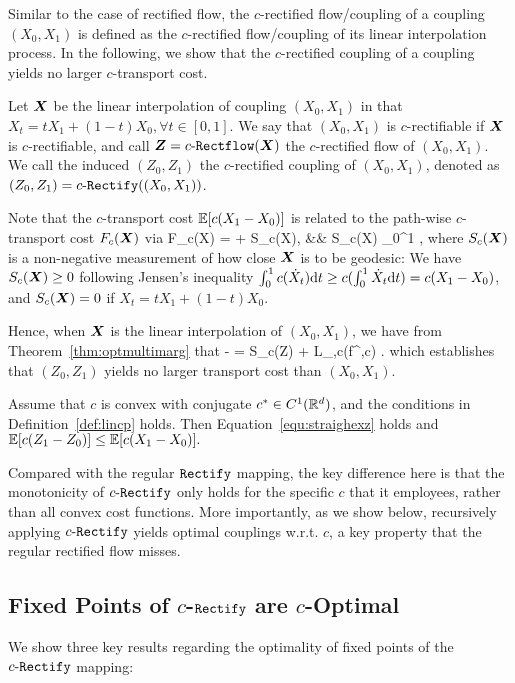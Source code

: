 Similar to the case of rectified flow, 
the $c$-rectified flow/coupling of a coupling $(X_0,X_1)$ 
is defined as the  $c$-rectified flow/coupling of its linear interpolation process.  
In the following, we show that the $c$-rectified coupling of a coupling %
yields no larger
{$c$-transport cost}. %

\begin{mydef}\label{def:lincp}
Let ${\boldsymbol{X}}$ be the linear interpolation of 
coupling $(X_0,X_1)$ in that $ X_t = t X_1 + (1-t) X_0,\forall t\in[0,1]$.  %
We say that $(X_0,X_1)$ is $c$-rectifiable if ${\boldsymbol{X}}$ is $c$-rectifiable, and call ${\boldsymbol{Z}} = c\text{-}\mathtt{Rectflow}({\boldsymbol{ X}})$ the $c$-rectified flow of $(X_0,X_1)$. 
We call the induced $(Z_0,Z_1)$ the $c$-rectified coupling of $(X_0,X_1)$, denoted as $(Z_0,Z_1) = c\text{-}\mathtt{Rectify}((X_0,X_1))$. 
\end{mydef}

Note that the 
$c$-transport cost $\mathbb{E}[c(X_1-X_0)]$ is related to 
{the path-wise $c$-transport cost $F_c({\boldsymbol{X}})$} via 
\bb 
F_{c}(\vv X) = \E[c(X_1-X_0)] + S_c(\vv X), 
&& S_c(\vv X)  \int_0^1 \E[c(\dot X_t) - c(X_1-X_0)] \dt, 
\ee 
where $S_c({\boldsymbol{X}})$ is a non-negative measurement of how close ${\boldsymbol{X}}$ is to be {geodesic}: 
We have $S_c({\boldsymbol{X}}) \geq 0$
 following Jensen's inequality $\int_0^1 c(\dot X_t)\mathrm{d}t  \geq c(\int_0^1 \dot X_t\mathrm{d}t ) = c(X_1-X_0)$, and $S_c({\boldsymbol{X}}) = 0$ if $X_t = t X_1 + (1-t) X_0$. 
 
Hence, when ${\boldsymbol{X}}$ is the linear interpolation of $(X_0,X_1)$, we have from Theorem~\ref{thm:optmultimarg} that 
 \bbb \label{equ:straighexz}  %
 \E[c(X_1-X_0)] - 
 \E[c(Z_1-Z_0)] = S_c(\vv Z) + L_{\X,c}(f^{\X,c}) .
 \eee 
 which establishes that $(Z_0,Z_1)$ yields no larger transport cost than $(X_0,X_1)$. 


\begin{thm}\label{thm:cost0}
Assume that $c$ is convex with conjugate $c^* \in C^1(\mathbb{R}^d)$,    %
 and the conditions in Definition~\ref{def:lincp} holds. Then Equation~\eqref{equ:straighexz} holds 
and $\mathbb{E}[c(Z_1-Z_0)] \leq \mathbb{E}[c(X_1-X_0)].$
\end{thm}
Compared with the regular $\mathtt{Rectify}$ mapping, 
the key difference here is that 
the monotonicity of $c\text{-}\mathtt{Rectify}$ only holds for the specific $c$ that it employees, rather than all convex cost functions. More importantly, 
as we show below,  
recursively applying $c\text{-}\mathtt{Rectify}$  
yields optimal couplings w.r.t. $c$, 
a key property that the regular rectified flow misses. 

\subsection{Fixed Points of 
$c$-{$\mathtt{Rectify}$} are 
$c$-Optimal}
\label{sec:crectifyFixed}
We show three key results regarding the optimality of fixed points of the $c\text{-}\mathtt{Rectify}$ mapping: 

